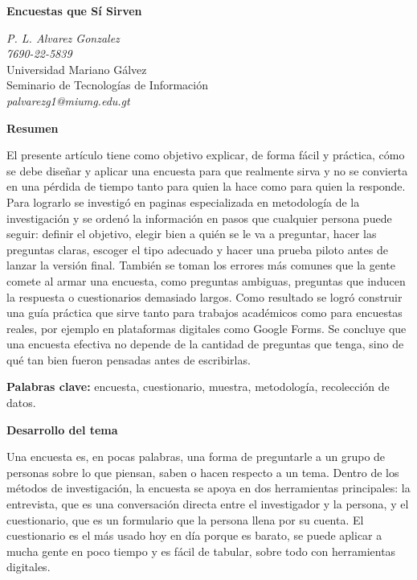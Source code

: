 \documentclass[12pt,letterpaper]{article}
\begin{document}
\begin{center}
\textbf{\Large Encuestas que Sí Sirven}
\end{center}

\begin{center}
\textit{P. L. Alvarez Gonzalez} \\
\textit{7690-22-5839} \\
Universidad Mariano Gálvez \\
Seminario de Tecnologías de Información \\
\textit{palvarezg1@miumg.edu.gt}
\end{center}

\vspace{0.5cm}

\textbf{Resumen}

El presente artículo tiene como objetivo explicar, de forma fácil y práctica, cómo se debe diseñar y aplicar una encuesta para que realmente sirva y no se convierta en una pérdida de tiempo tanto para quien la hace como para quien la responde. Para lograrlo se investigó en paginas especializada en metodología de la investigación y se ordenó la información en pasos que cualquier persona puede seguir: definir el objetivo, elegir bien a quién se le va a preguntar, hacer las preguntas claras, escoger el tipo adecuado y hacer una prueba piloto antes de lanzar la versión final. También se toman los errores más comunes que la gente comete al armar una encuesta, como preguntas ambiguas, preguntas que inducen la respuesta o cuestionarios demasiado largos. Como resultado se logró construir una guía práctica que sirve tanto para trabajos académicos como para encuestas reales, por ejemplo en plataformas digitales como Google Forms. Se concluye que una encuesta efectiva no depende de la cantidad de preguntas que tenga, sino de qué tan bien fueron pensadas antes de escribirlas.

\textbf{Palabras clave:} encuesta, cuestionario, muestra, metodología, recolección de datos.

\textbf{Desarrollo del tema}

Una encuesta es, en pocas palabras, una forma de preguntarle a un grupo de personas sobre lo que piensan, saben o hacen respecto a un tema. Dentro de los métodos de investigación, la encuesta se apoya en dos herramientas principales: la entrevista, que es una conversación directa entre el investigador y la persona, y el cuestionario, que es un formulario que la persona llena por su cuenta. El cuestionario es el más usado hoy en día porque es barato, se puede aplicar a mucha gente en poco tiempo y es fácil de tabular, sobre todo con herramientas digitales.
\end{document}

